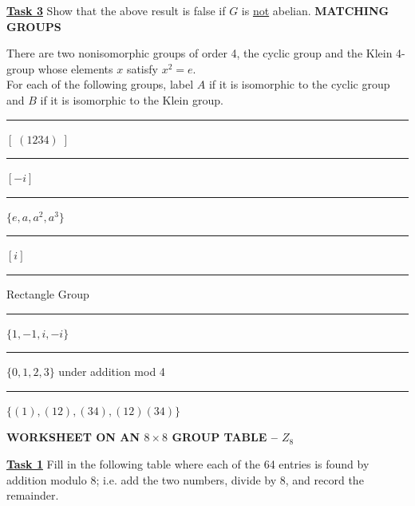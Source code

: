 \documentclass[12pt, fleqn, oneside]{book}
\begin{document}
\underline{\bf{Task 3}} Show that the above result is false if $G$ is \underline{not} abelian.
%
%
%
\clearpage
%
%
%
{\large \bf 	MATCHING GROUPS}\\[.25in]
There are two nonisomorphic groups of order 4, the cyclic group and the Klein 4-group whose elements $x$ satisfy $x^2=e$.\\[.25in]
For each of the following groups, label $A$ if it is isomorphic to the cyclic group and $B$ if it is isomorphic to the Klein group.\\[.25in]
\parbox{4in}{\rule{1in}{.01in} $[\;(1234)\;]$\\[.5in]
\rule{1in}{.01in} $[ -i]$\\[.5in]
\rule{1in}{.01in} $\{ e,a,a^2,a^3\}$\\[.5in]
\rule{1in}{.01in} $[i]$\\[.5in]
\rule{1in}{.01in} Rectangle Group\\[.5in]
\rule{1in}{.01in} $\{1,-1, i,-i\}$\\[.5in]
\rule{1in}{.01in} $\{0,1,2,3\}$ under addition mod 4\\[.5in]
\rule{1in}{.01in} $\{(1), (12), (34), (12)(34)\}$
}
%
%
%
\clearpage
%
%
%
{\large\bf WORKSHEET ON AN $8\times 8$ GROUP TABLE --  $Z_8$}\\[.25in]
%
\textbf{\underline{Task 1}} Fill in the following table where each of the 64 entries is found by addition modulo 8; i.e. add the two numbers, divide by 8, and record the remainder.\\[.5in]
\rule{0 in}{.5in}
\end{document}
